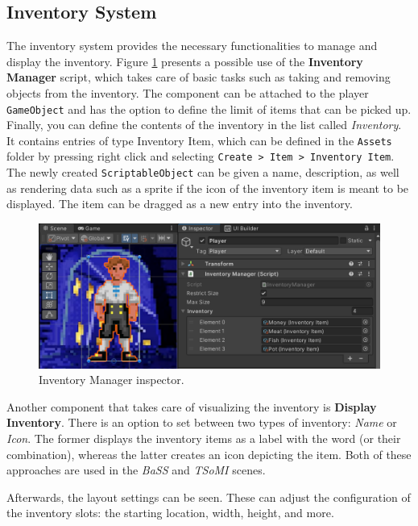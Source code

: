\subsection{Inventory System}
\label{UD-IS}
The inventory system provides the necessary functionalities to manage and display the inventory. Figure \ref{fig:Manual-Inventory} presents a possible use of the \textbf{Inventory Manager} script, which takes care of basic tasks such as taking and removing objects from the inventory. The component can be attached to the player \verb|GameObject| and has the option to define the limit of items that can be picked up. Finally, you can define the contents of the inventory in the list called \textit{Inventory}. It contains entries of type Inventory Item, which can be defined in the \verb|Assets| folder by pressing right click and selecting \verb|Create > Item > Inventory Item|. The newly created \verb|ScriptableObject| can be given a name, description, as well as rendering data such as a sprite if the icon of the inventory item is meant to be displayed. The item can be dragged as a new entry into the inventory.
\begin{figure}[H]
\centering
\includegraphics[width=1\linewidth]{img/User doc/inventory.png}
\caption{Inventory Manager inspector.}
\label{fig:Manual-Inventory}
\end{figure}

Another component that takes care of visualizing the inventory is \textbf{Display Inventory}. There is an option to set between two types of inventory: \textit{Name} or \textit{Icon}. The former displays the inventory items as a label with the word (or their combination), whereas the latter creates an icon depicting the item. Both of these approaches are used in the \textit{BaSS} and \textit{TSoMI} scenes.

Afterwards, the layout settings can be seen. These can adjust the configuration of the inventory slots: the starting location, width, height, and more. 


